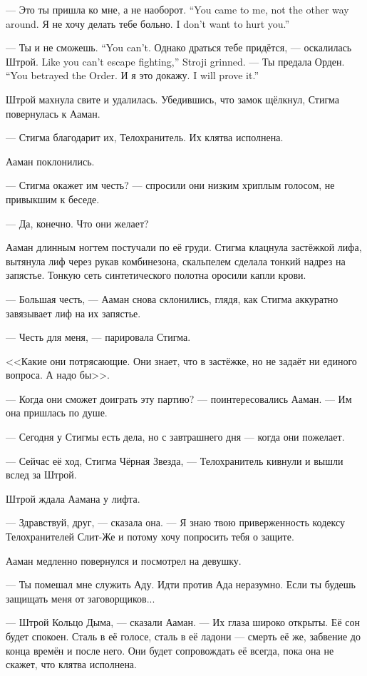 {--- Это ты пришла ко мне, а не наоборот.}
{``You came to me, not the other way around.}
{Я не хочу делать тебе больно.}
{I don't want to hurt you.''}

{--- Ты и не сможешь.}
{``You can't.}
{Однако драться тебе придётся, --- оскалилась Штрой.}
{Like you can't escape fighting,'' Stroji grinned.}
{--- Ты предала Орден.}
{``You betrayed the Order.}
{И я это докажу.}
{I will prove it.''}

Штрой махнула свите и удалилась.
Убедившись, что замок щёлкнул, Стигма повернулась к Ааман.

--- Стигма благодарит их, Телохранитель.
Их клятва исполнена.

Ааман поклонились.

--- Стигма окажет им честь? --- спросили они низким хриплым голосом, не привыкшим к беседе.

--- Да, конечно.
Что они желает?

Ааман длинным ногтем постучали по её груди.
Стигма клацнула застёжкой лифа, вытянула лиф через рукав комбинезона, скальпелем сделала тонкий надрез на запястье.
Тонкую сеть синтетического полотна оросили капли крови.

--- Большая честь, --- Ааман снова склонились, глядя, как Стигма аккуратно завязывает лиф на их запястье.

--- Честь для меня, --- парировала Стигма.

<<Какие они потрясающие.
Они знает, что в застёжке, но не задаёт ни единого вопроса.
А надо бы>>.

--- Когда они сможет доиграть эту партию? --- поинтересовались Ааман.
--- Им она пришлась по душе.

--- Сегодня у Стигмы есть дела, но с завтрашнего дня --- когда они пожелает.

--- Сейчас её ход, Стигма Чёрная Звезда, --- Телохранитель кивнули и вышли вслед за Штрой.

\asterism

Штрой ждала Аамана у лифта.

--- Здравствуй, друг, --- сказала она.
--- Я знаю твою приверженность кодексу Телохранителей Слит-Же и потому хочу попросить тебя о защите.

Ааман медленно повернулся и посмотрел на девушку.

--- Ты помешал мне служить Аду.
Идти против Ада неразумно.
Если ты будешь защищать меня от заговорщиков...

--- Штрой Кольцо Дыма, --- сказали Ааман.
--- Их глаза широко открыты.
Её сон будет спокоен.
Сталь в её голосе, сталь в её ладони --- смерть её же, забвение до конца времён и после него.
Они будет сопровождать её всегда, пока она не скажет, что клятва исполнена.

